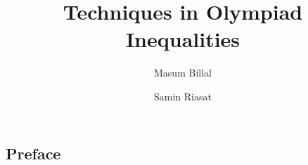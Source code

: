 \documentclass[a4paper, 12pt]{book}
\title{\bfseries Techniques in Olympiad Inequalities}
\author{Masum Billal\and Samin Riasat}
\theoremstyle{definition}
\numberwithin{problem}{chapter}
\begin{document}
	\frontmatter
	\maketitle
	\begin{refsection}
		\section*{Preface}
		\printbibliography
	\end{refsection}
	\tableofcontents
	\mainmatter
	
	\begin{refsection}
		
		
		
		
		
		
		\printbibliography
	\end{refsection}
	
	\begin{refsection}
		
		\printbibliography
	\end{refsection}

	\begin{refsection}
		
		\printbibliography
	\end{refsection}

	\begin{refsection}
		
		\printbibliography
	\end{refsection}
	
	\begin{refsection}
		
		
		\printbibliography
	\end{refsection}

	\begin{refsection}
		
		\printbibliography
	\end{refsection}

	\begin{refsection}
		
		\printbibliography
	\end{refsection}
	
	\begin{refsection}
		
		\printbibliography
	\end{refsection}

	\begin{refsection}
		
		\printbibliography
	\end{refsection}

	\begin{refsection}
		
		\printbibliography
	\end{refsection}
\end{document}
